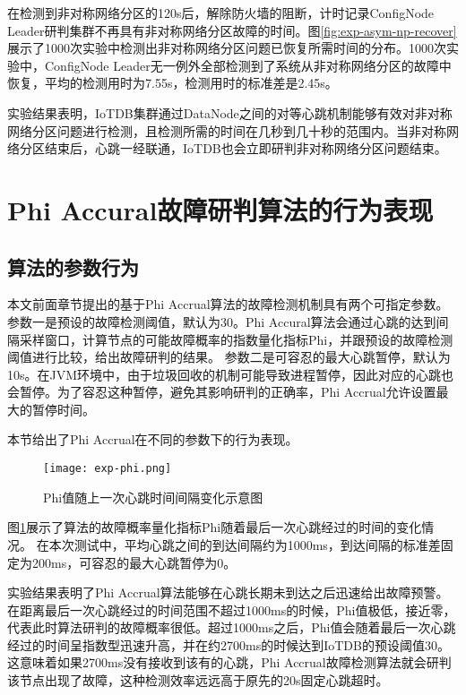 在检测到非对称网络分区的120s后，解除防火墙的阻断，计时记录ConfigNode Leader研判集群不再具有非对称网络分区故障的时间。图\ref{fig:exp-asym-np-recover}展示了1000次实验中检测出非对称网络分区问题已恢复所需时间的分布。1000次实验中，ConfigNode Leader无一例外全部检测到了系统从非对称网络分区的故障中恢复，平均的检测用时为7.55s，检测用时的标准差是2.45s。

实验结果表明，IoTDB集群通过DataNode之间的对等心跳机制能够有效对非对称网络分区问题进行检测，且检测所需的时间在几秒到几十秒的范围内。当非对称网络分区结束后，心跳一经联通，IoTDB也会立即研判非对称网络分区问题结束。


\section{Phi Accural故障研判算法的行为表现}

\subsection{算法的参数行为}

本文前面章节提出的基于Phi Accrual算法的故障检测机制具有两个可指定参数。
参数一是预设的故障检测阈值，默认为30。Phi Accural算法会通过心跳的达到间隔采样窗口，计算节点的可能故障概率的指数量化指标Phi，并跟预设的故障检测阈值进行比较，给出故障研判的结果。
参数二是可容忍的最大心跳暂停，默认为10s。在JVM环境中，由于垃圾回收的机制可能导致进程暂停，因此对应的心跳也会暂停。为了容忍这种暂停，避免其影响研判的正确率，Phi Accrual允许设置最大的暂停时间。

本节给出了Phi Accrual在不同的参数下的行为表现。

\begin{figure}
    \centering
    \texttt{[image: exp-phi.png]}
    \caption{Phi值随上一次心跳时间间隔变化示意图}
    \label{fig:exp-phi}
\end{figure}

图\ref{fig:exp-phi}展示了算法的故障概率量化指标Phi随着最后一次心跳经过的时间的变化情况。
在本次测试中，平均心跳之间的到达间隔约为1000ms，到达间隔的标准差固定为200ms，可容忍的最大心跳暂停为0。

实验结果表明了Phi Accrual算法能够在心跳长期未到达之后迅速给出故障预警。在距离最后一次心跳经过的时间范围不超过1000ms的时候，Phi值极低，接近零，代表此时算法研判的故障概率很低。超过1000ms之后，Phi值会随着最后一次心跳经过的时间呈指数型迅速升高，并在约2700ms的时候达到IoTDB的预设阈值30。这意味着如果2700ms没有接收到该有的心跳，Phi Accrual故障检测算法就会研判该节点出现了故障，这种检测效率远远高于原先的20s固定心跳超时。


